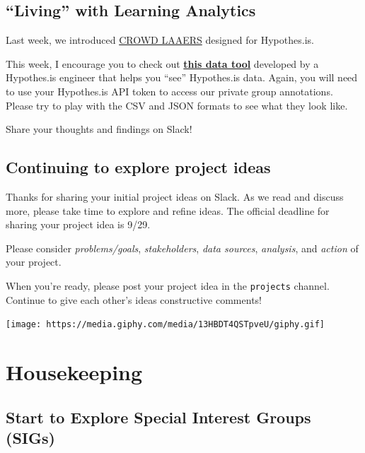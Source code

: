 \documentclass[
]{book}
\begin{document}
\hypertarget{living-with-learning-analytics}{%
\subsection{``Living'' with Learning Analytics}\label{living-with-learning-analytics}}

Last week, we introduced \href{https://crowdlaaers.org/}{CROWD LAAERS} designed for Hypothes.is.

This week, I encourage you to check out \href{https://jonudell.info/h/facet/}{\textbf{this data tool}} developed by a Hypothes.is engineer that helps you ``see'' Hypothes.is data. Again, you will need to use your Hypothes.is API token to access our private group annotations. Please try to play with the CSV and JSON formats to see what they look like.

Share your thoughts and findings on Slack!

\hypertarget{continuing-to-explore-project-ideas}{%
\subsection{Continuing to explore project ideas}\label{continuing-to-explore-project-ideas}}

Thanks for sharing your initial project ideas on Slack. As we read and discuss more, please take time to explore and refine ideas. The official deadline for sharing your project idea is 9/29.

Please consider \emph{problems/goals}, \emph{stakeholders}, \emph{data sources}, \emph{analysis}, and \emph{action} of your project.

When you're ready, please post your project idea in the \texttt{projects} channel. Continue to give each other's ideas constructive comments!

\texttt{[image: https://media.giphy.com/media/13HBDT4QSTpveU/giphy.gif]}

\hypertarget{housekeeping}{%
\section{Housekeeping}\label{housekeeping}}

\hypertarget{start-to-explore-special-interest-groups-sigs}{%
\subsection{Start to Explore Special Interest Groups (SIGs)}\label{start-to-explore-special-interest-groups-sigs}}
\end{document}
